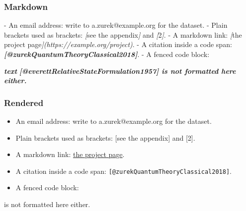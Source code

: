 \documentclass[
]{article}
\newenvironment{Shaded}{}{}
\newcommand{\CommentTok}[1]{\textcolor[rgb]{0.38,0.63,0.69}{\textit{#1}}}
\newcommand{\InformationTok}[1]{\textcolor[rgb]{0.38,0.63,0.69}{\textbf{\textit{#1}}}}
\newcommand{\NormalTok}[1]{#1}
\newcommand{\OtherTok}[1]{\textcolor[rgb]{0.00,0.44,0.13}{#1}}
\newcommand{\SpecialStringTok}[1]{\textcolor[rgb]{0.73,0.40,0.53}{#1}}
\providecommand{\tightlist}{%
  \setlength{\itemsep}{0pt}\setlength{\parskip}{0pt}}
\begin{document}
\subsubsection{Markdown}\label{markdown-10}

\begin{Shaded}
\begin{Highlighting}[]
\SpecialStringTok{{-} }\NormalTok{An email address: write to a.zurek@example.org for the dataset.}
\SpecialStringTok{{-} }\NormalTok{Plain brackets used as brackets: }\CommentTok{[}\OtherTok{see the appendix}\CommentTok{]}\NormalTok{ and }\CommentTok{[}\OtherTok{2}\CommentTok{]}\NormalTok{.}
\SpecialStringTok{{-} }\NormalTok{A markdown link: }\CommentTok{[}\OtherTok{the project page}\CommentTok{](https://example.org/project)}\NormalTok{.}
\SpecialStringTok{{-} }\NormalTok{A citation inside a code span: }\InformationTok{\textasciigrave{}[@zurekQuantumTheoryClassical2018]\textasciigrave{}}\NormalTok{.}
\SpecialStringTok{{-} }\NormalTok{A fenced code block:}

\InformationTok{\textasciigrave{}\textasciigrave{}\textasciigrave{}text}
\InformationTok{[@everettRelativeStateFormulation1957] is not formatted here either.}
\InformationTok{\textasciigrave{}\textasciigrave{}\textasciigrave{}}
\end{Highlighting}
\end{Shaded}

\subsubsection{Rendered}\label{rendered-10}

\begin{itemize}
\tightlist
\item
  An email address: write to a.zurek@example.org for the dataset.
\item
  Plain brackets used as brackets: {[}see the appendix{]} and {[}2{]}.
\item
  A markdown link: \href{https://example.org/project}{the project page}.
\item
  A citation inside a code span:
  \texttt{{[}@zurekQuantumTheoryClassical2018{]}}.
\item
  A fenced code block:
\end{itemize}

\begin{Shaded}
\begin{Highlighting}[]
\NormalTok{[@everettRelativeStateFormulation1957] is not formatted here either.}
\end{Highlighting}
\end{Shaded}
\end{document}
